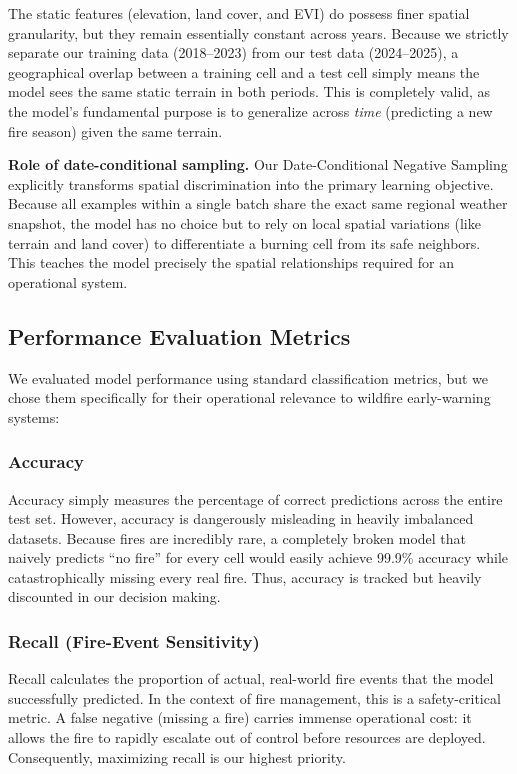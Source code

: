\documentclass[11pt]{article}
\begin{document}
The static features (elevation, land cover, and EVI) do possess finer spatial granularity, but they remain essentially constant across years. Because we strictly separate our training data (2018--2023) from our test data (2024--2025), a geographical overlap between a training cell and a test cell simply means the model sees the same static terrain in both periods. This is completely valid, as the model's fundamental purpose is to generalize across \textit{time} (predicting a new fire season) given the same terrain.

\medskip
\noindent\textbf{Role of date-conditional sampling.}
Our Date-Conditional Negative Sampling explicitly transforms spatial discrimination into the primary learning objective. Because all examples within a single batch share the exact same regional weather snapshot, the model has no choice but to rely on local spatial variations (like terrain and land cover) to differentiate a burning cell from its safe neighbors. This teaches the model precisely the spatial relationships required for an operational system.

\subsection{Performance Evaluation Metrics}

We evaluated model performance using standard classification metrics, but we chose them specifically for their operational relevance to wildfire early-warning systems:

\subsubsection{Accuracy}

Accuracy simply measures the percentage of correct predictions across the entire test set. However, accuracy is dangerously misleading in heavily imbalanced datasets. Because fires are incredibly rare, a completely broken model that naively predicts ``no fire'' for every cell would easily achieve 99.9\% accuracy while catastrophically missing every real fire. Thus, accuracy is tracked but heavily discounted in our decision making.

\subsubsection{Recall (Fire-Event Sensitivity)}

Recall calculates the proportion of actual, real-world fire events that the model successfully predicted. In the context of fire management, this is a safety-critical metric. A false negative (missing a fire) carries immense operational cost: it allows the fire to rapidly escalate out of control before resources are deployed. Consequently, maximizing recall is our highest priority.
\end{document}

